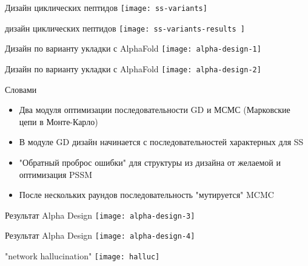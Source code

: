 \begin{frame}{Дизайн циклических пептидов}
    \centering
		\texttt{[image: ss-variants]}  
\end{frame}


\begin{frame}{дизайн циклических пептидов}
		\texttt{[image: ss-variants-results ]}  
\end{frame}


\begin{frame}{Дизайн по варианту укладки с AlphaFold}
    \centering
		\texttt{[image: alpha-design-1]}  
\end{frame}

\begin{frame}{Дизайн по варианту укладки с AlphaFold}
    \centering
		\texttt{[image: alpha-design-2]}  
\end{frame}


\begin{frame}{Словами}
        \begin{itemize}
            \item Два модуля оптимизации последовательности GD и МСМС (Марковские цепи в Монте-Карло)
            \item В модуле  GD дизайн начинается с последовательностей характерных  для SS
            \item "Обратный проброс ошибки" для структуры из дизайна от желаемой и оптимизация PSSM
            \item После нескольких раундов последовательность "мутируется" MCMC
            \end{itemize}        
\end{frame}
                


\begin{frame}{Результат Alpha Design}
    \centering
		\texttt{[image: alpha-design-3]}  
\end{frame}

\begin{frame}{Результат Alpha Design}
    \centering
		\texttt{[image: alpha-design-4]}  
\end{frame}



\begin{frame}{"network hallucination"}
    \centering
    \texttt{[image: halluc]}
\end{frame}

